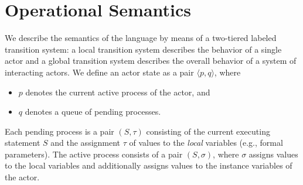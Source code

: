 \section{Operational Semantics} \label{sec:sos}
We describe the semantics of the language by means of a two-tiered labeled transition system:
a local transition system describes the behavior of a single actor and a global transition system
describes the overall behavior of a system of interacting actors.
We define an actor state as a pair $\langle p,q \rangle$, where
\begin{itemize}
 \item $p$ denotes the current active process of the actor, and
 \item $q$ denotes a queue of pending processes.
\end{itemize}
Each pending process is a pair  $(S, \tau)$ consisting of the current executing statement $S$ and the assignment $\tau$ of 
values  to the  \emph{local} variables (e.g., formal parameters).
The active process consists of a  pair  $(S,\sigma)$, where $\sigma$ assigns values to the local variables
and additionally assigns values to the instance variables
of the actor.




% 

